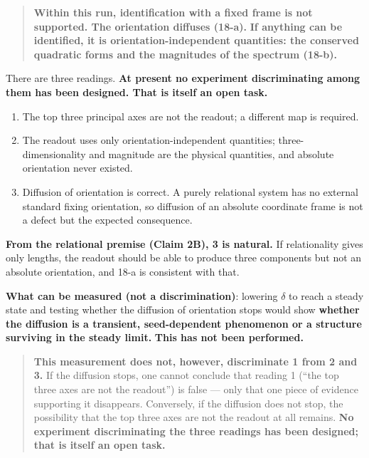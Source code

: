 \documentclass[
  10pt,
]{article}
\providecommand{\tightlist}{%
  \setlength{\itemsep}{0pt}\setlength{\parskip}{0pt}}
\begin{document}
\begin{quote}
\textbf{Within this run, identification with a fixed frame is not
supported. The orientation diffuses (18-a).} \textbf{If anything can be
identified, it is orientation-independent quantities: the conserved
quadratic forms and the magnitudes of the spectrum (18-b).}
\end{quote}

There are three readings. \textbf{At present no experiment
discriminating among them has been designed. That is itself an open
task.}

\begin{enumerate}
\def\labelenumi{\arabic{enumi}.}
\tightlist
\item
  The top three principal axes are not the readout; a different map is
  required.
\item
  The readout uses only orientation-independent quantities;
  three-dimensionality and magnitude are the physical quantities, and
  absolute orientation never existed.
\item
  Diffusion of orientation is correct. A purely relational system has no
  external standard fixing orientation, so diffusion of an absolute
  coordinate frame is not a defect but the expected consequence.
\end{enumerate}

\textbf{From the relational premise (Claim 2B), 3 is natural.} If
relationality gives only lengths, the readout should be able to produce
three components but not an absolute orientation, and 18-a is consistent
with that.

\textbf{What can be measured (not a discrimination)}: lowering
\(\delta\) to reach a steady state and testing whether the diffusion of
orientation stops would show \textbf{whether the diffusion is a
transient, seed-dependent phenomenon or a structure surviving in the
steady limit.} \textbf{This has not been performed.}

\begin{quote}
\textbf{This measurement does not, however, discriminate 1 from 2 and
3.} If the diffusion stops, one cannot conclude that reading 1 (``the
top three axes are not the readout'') is false --- only that one piece
of evidence supporting it disappears. Conversely, if the diffusion does
not stop, the possibility that the top three axes are not the readout at
all remains. \textbf{No experiment discriminating the three readings has
been designed; that is itself an open task.}
\end{quote}
\end{document}
